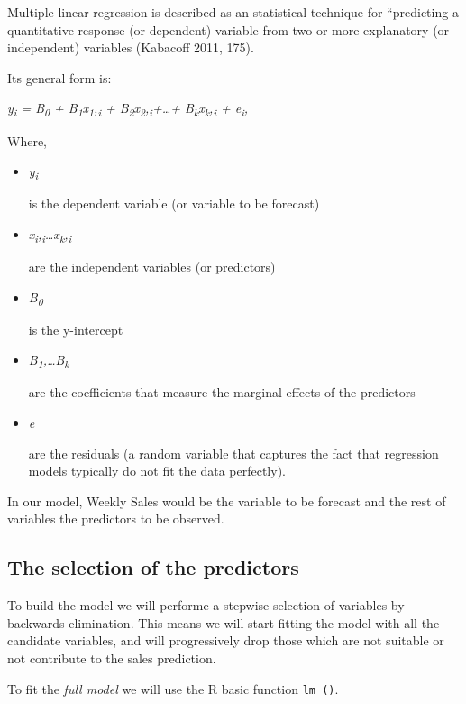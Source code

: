 \documentclass[11pt,]{article}
\providecommand{\tightlist}{%
  \setlength{\itemsep}{0pt}\setlength{\parskip}{0pt}}
\begin{document}
Multiple linear regression is described as an statistical technique for
``predicting a quantitative response (or dependent) variable from two or
more explanatory (or independent) variables (Kabacoff 2011, 175).

Its general form is:

{\emph{y\textsubscript{i} = B\textsubscript{0} +
B\textsubscript{1}x\textsubscript{1},\textsubscript{i} +
B\textsubscript{2}x\textsubscript{2},\textsubscript{i}+\ldots{}+
B\textsubscript{k}x\textsubscript{k},\textsubscript{i} +
e\textsubscript{i},}}

Where,

\begin{itemize}
\tightlist
\item
  {\emph{y\textsubscript{i}}}

  is the dependent variable (or variable to be forecast)
\item
  {\emph{x\textsubscript{i},\textsubscript{i}\ldots{}x\textsubscript{k},\textsubscript{i}}}

  are the independent variables (or predictors)
\item
  {\emph{B\textsubscript{0}}}

  is the y-intercept
\item
  {\emph{B\textsubscript{1},\ldots{}B\textsubscript{k}}}

  are the coefficients that measure the marginal effects of the
  predictors
\item
  {\emph{e}}

  are the residuals (a random variable that captures the fact that
  regression models typically do not fit the data perfectly).
\end{itemize}

In our model, Weekly Sales would be the variable to be forecast and the
rest of variables the predictors to be observed.

\subsection{The selection of the
predictors}\label{the-selection-of-the-predictors}

To build the model we will performe a stepwise selection of variables by
backwards elimination. This means we will start fitting the model with
all the candidate variables, and will progressively drop those which are
not suitable or not contribute to the sales prediction.

To fit the \emph{full model} we will use the R basic function
\texttt{lm\ ()}.
\end{document}
